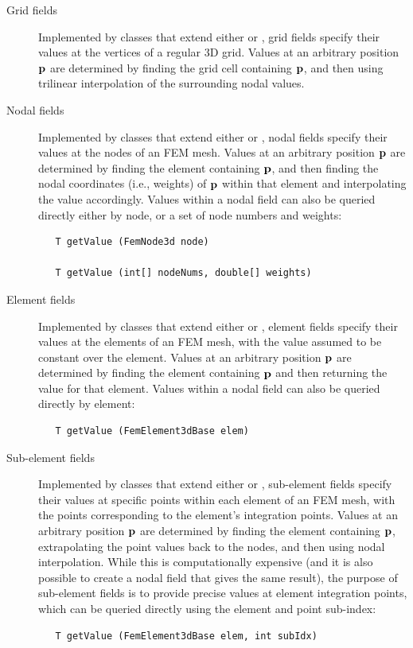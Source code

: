 \begin{description}

\item[Grid fields] Implemented by classes that extend either
 or
, grid fields
specify their values at the vertices of a regular 3D grid.
Values at an
arbitrary position ${\bf p}$ are determined by finding the grid
cell containing ${\bf p}$, and then using 
trilinear interpolation of the surrounding nodal values.

\item[Nodal fields] Implemented by classes that extend either
 or
, nodal fields
specify their values at the nodes of an FEM mesh.  Values at an
arbitrary position ${\bf p}$ are determined by finding the element
containing ${\bf p}$, and then finding the nodal coordinates (i.e., weights) of
${\bf p}$ within that element and interpolating the value
accordingly. Values within a nodal field can also be queried directly
either by node, or a set of node numbers and weights:
\begin{verbatim}
   T getValue (FemNode3d node)

   T getValue (int[] nodeNums, double[] weights)
\end{verbatim}

\item[Element fields] Implemented by classes that extend either
 or
, element
fields specify their values at the elements of an FEM mesh, with the
value assumed to be constant over the element. Values at an arbitrary
position ${\bf p}$ are determined by finding the element containing ${\bf p}$
and then returning the value for that element. Values within a nodal
field can also be queried directly by element:
\begin{verbatim}
   T getValue (FemElement3dBase elem)
\end{verbatim}

\item[Sub-element fields] Implemented by classes that extend either
 or
, sub-element
fields specify their values at specific points within each element of
an FEM mesh, with the points corresponding to the
element's integration points. Values at an arbitrary position ${\bf p}$ are
determined by finding the element containing ${\bf p}$, extrapolating the
point values back to the nodes, and then using nodal interpolation.
While this is computationally expensive (and it is also possible to
create a nodal field that gives the same result), the purpose of
sub-element fields is to provide precise values at element integration
points, which can be queried directly using the element and
point sub-index:
\begin{verbatim}
   T getValue (FemElement3dBase elem, int subIdx)
\end{verbatim}

\end{description}

